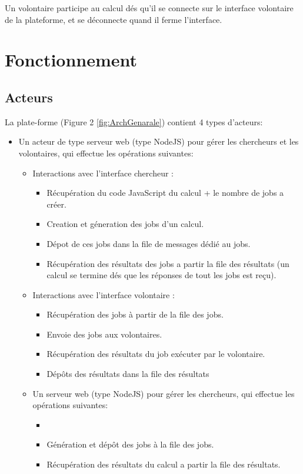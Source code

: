 \documentclass[a4paper]{article}
\begin{document}
Un volontaire participe au calcul dés qu'il se connecte sur le interface volontaire de la plateforme, et se déconnecte quand il ferme l'interface.



\section{Fonctionnement}
\subsection{Acteurs}
La plate-forme (Figure 2 \ref{fig:ArchGenarale}) contient 4 types d'acteurs:
\begin{itemize}
\item Un acteur de type serveur web (type NodeJS) pour gérer les chercheurs et les volontaires, qui effectue les opérations suivantes:
\begin{itemize}

\item Interactions avec l'interface chercheur :
\begin{itemize}
\item Récupération du code JavaScript du calcul + le nombre de jobs a créer.
\item Creation et géneration des jobs d'un calcul.
\item Dépot de ces jobs dans la file de messages dédié au jobs.
\item Récupération des résultats des jobs a partir la file des résultats (un calcul se termine dés que les réponses de tout les jobs est reçu).
\end{itemize}

\item Interactions avec l'interface volontaire :
\begin{itemize}
\item Récupération des jobs à partir de la file des jobs.
\item Envoie des jobs aux volontaires.
\item Récupération des résultats du job exécuter par le volontaire.
\item Dépôts des résultats dans la file des résultats
\end{itemize} 

\item Un serveur web (type NodeJS) pour gérer les chercheurs, qui effectue les opérations suivantes:
\begin{itemize}
\item 
\item Génération et dépôt des jobs à la file des jobs.
\item Récupération des résultats du calcul a partir la file des résultats.
\end{itemize} 

\end{itemize}
  
\end{itemize} 
\end{document}
